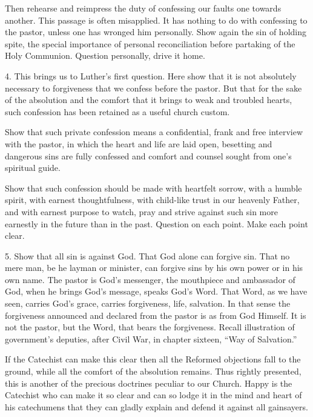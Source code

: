 Then rehearse and reimpress the duty of confessing our faults one towards another. This passage is often misapplied. It has nothing to do with confessing to the pastor, unless one has wronged him personally. Show again the sin of holding spite, the special importance of personal reconciliation before partaking of the Holy Communion. Question personally, drive it home.

4. This brings us to Luther’s first question. Here show that it is not absolutely necessary to forgiveness that we confess before the pastor. But that for the sake of the absolution and the comfort that it brings to weak and troubled hearts, such confession has been retained as a useful church custom.

Show that such private confession means a confidential, frank and free interview with the pastor, in which the heart and life are laid open, besetting and dangerous sins are fully confessed and comfort and counsel sought from one’s spiritual guide.

Show that such confession should be made with heartfelt sorrow, with a humble spirit, with earnest
thoughtfulness, with child-like trust in our heavenly Father, and with earnest purpose to watch, pray and strive against such sin more earnestly in the future than in the past. Question on each point. Make each point clear.

5. Show that all sin is against God. That God alone can forgive sin. That no mere man, be he layman or minister, can forgive sins by his own power or in his own name. The pastor is God’s messenger, the mouthpiece and ambassador of God, when he brings God’s message, speaks God’s Word. That Word, as we have seen, carries God’s grace, carries forgiveness, life, salvation. In that sense the forgiveness announced and declared from the pastor is as from God Himself. It is not the pastor, but the Word, that bears the forgiveness. Recall illustration of government’s deputies, after Civil War, in chapter sixteen, “Way of Salvation.” 

If the Catechist can make this clear then all the Reformed objections fall to the ground, while all the comfort of the absolution remains. Thus rightly presented, this is another of the precious doctrines peculiar to our Church. Happy is the Catechist who can make it so clear and can so lodge it in the mind and heart of his catechumens that they can gladly explain and defend it against all gainsayers.

